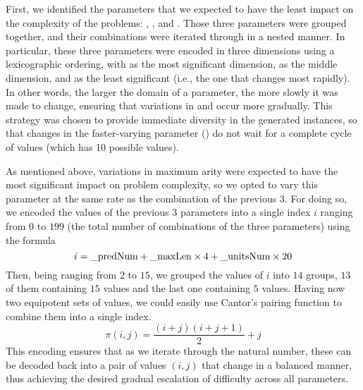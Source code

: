 First, we identified the parameters that we expected to have the least impact on the complexity of the problems: , , and .
Those three parameters were grouped together, and their combinations were iterated through in a nested manner.
In particular, these three parameters were encoded in three dimensions using a lexicographic ordering, with  as the most significant dimension,  as the middle dimension, and  as the least significant (i.e., the one that changes most rapidly).
In other words, the larger the domain of a parameter, the more slowly it was made to change, ensuring that variations in  and  occur more gradually.
This strategy was chosen to provide immediate diversity in the generated instances, so that changes in the faster-varying parameter () do not wait for a complete cycle of  values (which has 10 possible values).

As mentioned above, variations in maximum arity were expected to have the most significant impact on problem complexity, so we opted to vary this parameter at the same rate as the combination of the previous 3.
For doing so, we encoded the values of the previous 3 parameters into a single index \(i\) ranging from \(0\) to \(199\) (the total number of combinations of the three parameters) using the formula
\[i = \text{\code{_predNum}} + \text{\code{_maxLen}} \times 4 + \text{\code{_unitsNum}} \times 20\]
Then, being  ranging from \(2\) to \(15\), we grouped the values of \(i\) into \(14\) groups, \(13\) of them containing \(15\) values and the last one containing \(5\) values.
Having now two equipotent sets of values, we could easily use Cantor's pairing function to combine them into a single index.
\[\pi(i, j) = \frac{(i + j)(i + j + 1)}{2} + j\]
This encoding ensures that as we iterate through the natural number, these can be decoded back into a pair of values \((i, j)\) that change in a balanced manner, thus achieving the desired gradual escalation of difficulty across all parameters.

